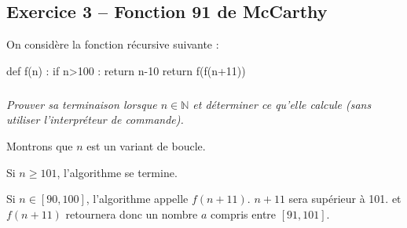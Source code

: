 \documentclass[10pt,fleqn]{book} %
\begin{document}
\begin{multicols}{2}
\section*{Exercice 3 -- Fonction 91 de McCarthy}
On considère la fonction récursive suivante : 
\begin{py}
\begin{python}
def f(n) :
    if n>100 : 
        return n-10
    return f(f(n+11))
\end{python}
\end{py}

\subparagraph*{} \textit{Prouver sa terminaison lorsque $n\in\mathbb{N}$ et déterminer ce qu'elle calcule (sans utiliser l'interpréteur de commande).}
\ifprof
\begin{corrige}
Montrons que $n$ est un variant de boucle.

Si $n\geq 101$, l'algorithme se termine. 

Si $n\in\left[90, 100\right]$, l'algorithme appelle $f(n+11)$.  $n+11$ sera supérieur à 101. 
 et  $f(n+11)$ retournera donc un nombre $a$ compris entre $\left[91, 101\right]$. 


\end{corrige}
\else
\fi

%
%


\end{multicols}
\end{document}
